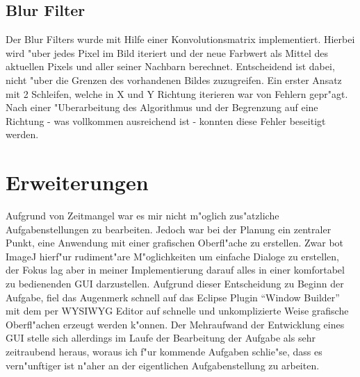 \documentclass[a4paper]{article}
\begin{document}
\subsection{Blur Filter}
Der Blur Filters wurde mit Hilfe einer Konvolutionsmatrix implementiert. Hierbei wird "uber jedes Pixel im Bild iteriert und der neue Farbwert als Mittel des aktuellen Pixels und aller seiner Nachbarn berechnet. Entscheidend ist dabei, nicht "uber die Grenzen des vorhandenen Bildes zuzugreifen. Ein erster Ansatz mit 2 Schleifen, welche in X und Y Richtung iterieren war von Fehlern gepr"agt. Nach einer "Uberarbeitung des Algorithmus und der Begrenzung auf eine Richtung - was vollkommen ausreichend ist - konnten diese Fehler beseitigt werden.

\section{Erweiterungen}
Aufgrund von Zeitmangel war es mir nicht m"oglich zus"atzliche Aufgabenstellungen zu bearbeiten. Jedoch war bei der Planung ein zentraler Punkt, eine Anwendung mit einer grafischen Oberfl"ache zu erstellen. Zwar bot ImageJ hierf"ur rudiment"are M"oglichkeiten um einfache Dialoge zu erstellen, der Fokus lag aber in meiner Implementierung darauf alles in einer komfortabel zu bedienenden GUI darzustellen.
Aufgrund dieser Entscheidung zu Beginn der Aufgabe, fiel das Augenmerk schnell auf das Eclipse Plugin ``Window Builder'' mit dem per WYSIWYG Editor auf schnelle und unkomplizierte Weise grafische Oberfl"achen erzeugt werden k"onnen. 
Der Mehraufwand der Entwicklung eines GUI stelle sich allerdings im Laufe der Bearbeitung der Aufgabe als sehr zeitraubend heraus, woraus ich f"ur kommende Aufgaben schlie"se, dass es vern"unftiger ist n"aher an der eigentlichen Aufgabenstellung zu arbeiten.

\newpage

{}

\end{document}
